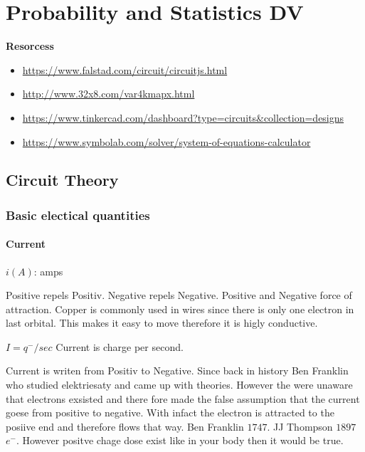 \chapter{Probability and Statistics DV}

\newpage


\textbf{Resorcess}
\begin{itemize}
    \item \url{https://www.falstad.com/circuit/circuitjs.html}
    \item \url{http://www.32x8.com/var4kmapx.html}
    \item \url{https://www.tinkercad.com/dashboard?type=circuits&collection=designs}
    \item \url{https://www.symbolab.com/solver/system-of-equations-calculator}
\end{itemize}

\section{Circuit Theory}
\subsection{Basic electical quantities}
\subsubsection{Current}
$i (A)$: amps \newline

Positive repels Positiv. Negative repels Negative. Positive and Negative force of attraction.
Copper is commonly used in wires since there is only one electron in last orbital. This makes it easy
to move therefore it is higly conductive. \newline

$I = q^{-} / sec$ Current is charge per second. \newline

Current is writen from Positiv to Negative. Since back in history Ben Franklin who studied elektriesaty and
came up with theories. However the were unaware that electrons exsisted and there fore made the false
assumption that the current goese from positive to negative. With infact the electron is attracted to
the posiive end and therefore flows that way.
Ben Franklin $1747$.
JJ Thompson $1897$ $e^{-}$.
However positve chage dose exist like in your body then it would be true. \newline

